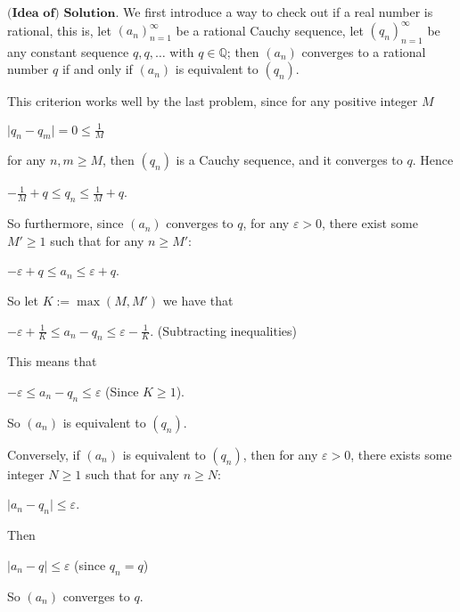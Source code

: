 \documentclass{article}
\theoremstyle{remark}
\begin{document}
\begin{enumerate}
            $\textbf{(Idea of) Solution.}$
            We first introduce a way to check out if a real number is rational, this is, 
            let $(a_n)_{n=1}^{\infty}$ be a rational Cauchy sequence, let $(q_n)_{n=1}^{\infty}$
            be any constant sequence $q, q, \dots$ with $q \in \mathbb{Q}$; then
            $(a_n)$ converges to a rational number $q$ if and only if $(a_n)$ is equivalent to $(q_n)$.

            This criterion works well by the last problem, since for any positive integer $M$
            \begin{center}
                $\displaystyle \vert q_n - q_m\vert = 0 \leq \frac{1}{M}$
            \end{center}
            for any $n,m \geq M$, then $(q_n)$ is a Cauchy sequence, and it converges to $q$. Hence
            \begin{center}
                $\displaystyle -\frac{1}{M} + q \leq q_n \leq \frac{1}{M} + q$.
            \end{center}
            
            So furthermore, since $(a_n)$ converges to $q$, 
            for any $\varepsilon > 0$, there exist some $M' \geq 1$ such that for any $n \geq M'$: 
            \begin{center}
                $\displaystyle -\varepsilon + q \leq a_n \leq \varepsilon + q$.
            \end{center}
            So let $K := \max(M, M')$ we have that
            \begin{center}
                $\displaystyle -\varepsilon + \frac{1}{K} \leq a_n - q_n \leq \varepsilon - \frac{1}{K}$. (Subtracting inequalities)
            \end{center}
            This means that 
            \begin{center}
                $\displaystyle -\varepsilon \leq a_n - q_n \leq \varepsilon$ (Since $K \geq 1$).
            \end{center}
            So $(a_n)$ is equivalent to $(q_n)$.

            Conversely, if $(a_n)$ is equivalent to $(q_n)$, then for any $\varepsilon > 0$, there exists some integer $N \geq 1$
            such that for any $n \geq N$:
            \begin{center}
                $\displaystyle \vert a_n - q_n \vert \leq \varepsilon$.
            \end{center}
            Then
            \begin{center}
                $\displaystyle \vert a_n - q \vert \leq \varepsilon$ (since $q_n = q$)
            \end{center}
            So $(a_n)$ converges to $q$.


\end{enumerate}
\end{document}

